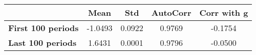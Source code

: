 \begin{tiny}\begin{tabular}{|l|c|c|c|c|}
\hline
&\textbf{Mean}&\textbf{Std}&\textbf{AutoCorr}&\textbf{Corr with g}\\\hline
\textbf{First 100 periods}&-1.0493&0.0922&0.9769&-0.1754\\\hline
\textbf{Last 100 periods}&1.6431&0.0001&0.9796&-0.0500\\\hline
\end{tabular}
\end{tiny}